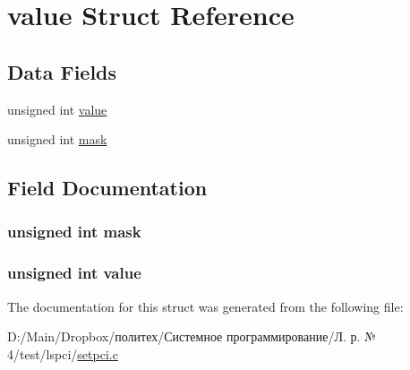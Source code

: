 \hypertarget{structvalue}{}\section{value Struct Reference}
\label{structvalue}
\subsection*{Data Fields}
\begin{DoxyCompactItemize}
\item 
unsigned int \hyperlink{structvalue_a2a5a27690c40c531d0a8385dc4f66a95}{value}
\item 
unsigned int \hyperlink{structvalue_a9329373e072de2722816d1c2934405db}{mask}
\end{DoxyCompactItemize}


\subsection{Field Documentation}
\subsubsection[{\texorpdfstring{mask}{mask}}]{\setlength{\rightskip}{0pt plus 5cm}unsigned int mask}\hypertarget{structvalue_a9329373e072de2722816d1c2934405db}{}\label{structvalue_a9329373e072de2722816d1c2934405db}
\subsubsection[{\texorpdfstring{value}{value}}]{\setlength{\rightskip}{0pt plus 5cm}unsigned int {\bf value}}\hypertarget{structvalue_a2a5a27690c40c531d0a8385dc4f66a95}{}\label{structvalue_a2a5a27690c40c531d0a8385dc4f66a95}


The documentation for this struct was generated from the following file\+:\begin{DoxyCompactItemize}
\item 
D\+:/\+Main/\+Dropbox/политех/Системное программирование/Л. р. № 4/test/lspci/\hyperlink{setpci_8c}{setpci.\+c}\end{DoxyCompactItemize}
